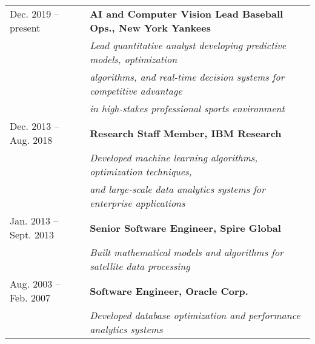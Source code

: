 \documentclass[12pt]{article}
\begin{document}
\begin{tabular}{l l}
Dec. 2019 -- present & \textbf{AI and Computer Vision Lead Baseball Ops., New York Yankees} \\
& \textit{Lead quantitative analyst developing predictive models, optimization} \\
& \textit{algorithms, and real-time decision systems for competitive advantage} \\
& \textit{in high-stakes professional sports environment} \\
Dec. 2013 -- Aug. 2018 & \textbf{Research Staff Member, IBM Research} \\
& \textit{Developed machine learning algorithms, optimization techniques,} \\
& \textit{and large-scale data analytics systems for enterprise applications} \\
Jan. 2013 -- Sept. 2013 & \textbf{Senior Software Engineer, Spire Global} \\
& \textit{Built mathematical models and algorithms for satellite data processing} \\
Aug. 2003 -- Feb. 2007 & \textbf{Software Engineer, Oracle Corp.} \\
& \textit{Developed database optimization and performance analytics systems} \\
\end{tabular}
\end{document}
